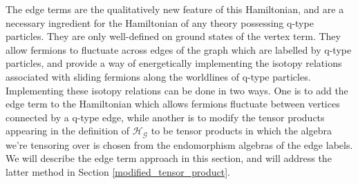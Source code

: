 \documentclass[12pt,a4paper]{article}
\newcommand{\mce}{\mathcal{E}}
\newcommand{\mcg}{\mathcal{G}}
\newcommand{\mch}{\mathcal{H}}
\newcommand{\mcv}{\mathcal{V}}
\newcommand{\End}{\text{End}}
\newcommand{\cl}{\mathbb{C}\ell}
\newcommand{\dave}[1]{{\color{ao(english)}\footnotesize{(DA) #1}}}
\begin{document}
The edge terms are the qualitatively new feature of this Hamiltonian, and are a necessary ingredient for the Hamiltonian of any theory possessing q-type particles. 
They are only well-defined on ground states of the vertex term. 
They allow fermions to fluctuate across edges of the graph which are labelled by q-type particles,
and provide a way of energetically implementing the isotopy relations associated with sliding fermions along the worldlines of q-type particles. 
Implementing these isotopy relations can be done in two ways. 
One is to add the edge term to the Hamiltonian which allows fermions fluctuate between vertices connected by a q-type edge, while another is to modify the tensor products appearing in the definition of $\mch_\mcg$ to be tensor products in which the algebra we're tensoring over is
chosen from the endomorphism algebras of the edge labels. 
We will describe the edge term approach in this section, and will address the latter method in Section \ref{modified_tensor_product}. 



\end{document}

